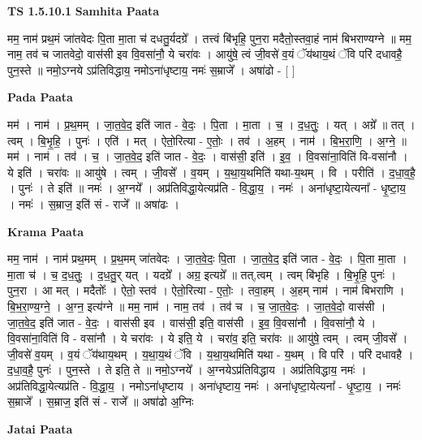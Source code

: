 \documentclass[17pt]{extarticle}
\begin{document}
\textbf{TS 1.5.10.1 } \newline
\textbf{Samhita Paata} \newline

मम॒ नाम॑ प्रथ॒मं जा॑तवेदः पि॒ता मा॒ता च॑ दधतु॒र्यदग्रे᳚ । तत्त्वं बि॑भृहि॒ पुन॒रा मदैतो॒स्तवा॒हं नाम॑ बिभराण्यग्ने ॥ मम॒ नाम॒ तव॑ च जातवेदो॒ वास॑सी इव वि॒वसा॑नौ॒ ये चरा॑वः । आयु॑षे॒ त्वं जी॒वसे॑ व॒यं ॅय॑थाय॒थं ॅवि परि॑ दधावहै॒ पुन॒स्ते ॥ नमो॒ऽग्नये ऽप्र॑तिविद्धाय॒ नमोऽना॑धृष्टाय॒ नमः॑ स॒म्राजे᳚ । अषा॑ढो - [ ] \newline

\textbf{Pada Paata} \newline

मम॑ । नाम॑ । प्र॒थ॒मम् । जा॒त॒वे॒द॒ इति॑ जात - वे॒दः॒ । पि॒ता । मा॒ता । च॒ । द॒ध॒तुः॒ । यत् । अग्रे᳚ ॥ तत् । त्वम् । बि॒भृ॒हि॒ । पुनः॑ । एति॑ । मत् । ऐतो॒रित्या - ए॒तोः॒ । तव॑ । अ॒हम् । नाम॑ । बि॒भ॒रा॒णि॒ । अ॒ग्ने॒ ॥ मम॑ । नाम॑ । तव॑ । च॒ । जा॒त॒वे॒द॒ इति॑ जात - वे॒दः॒ । वास॑सी॒ इति॑ । इ॒व॒ । वि॒वसा॑ना॒विति॑ वि-वसा॑नौ । ये इति॑ । चरा॑वः ॥ आयु॑षे । त्वम् । जी॒वसे᳚ । व॒यम् । य॒था॒य॒थमिति॑ यथा-य॒थम् । वि । परीति॑ । द॒धा॒व॒है॒ । पुनः॑ । ते इति॑ ॥ नमः॑ । अ॒ग्नये᳚ । अप्र॑तिविद्धा॒येत्यप्र॑ति - वि॒द्धा॒य॒ । नमः॑ । अना॑धृष्टा॒येत्यना᳚ - धृ॒ष्टा॒य॒ । नमः॑ । स॒म्राज॒ इति॑ सं - राजे᳚ ॥ अषा॑ढः ।  \newline


\textbf{Krama Paata} \newline

मम॒ नाम॑ । नाम॑ प्रथ॒मम् । प्र॒थ॒मम् जा॑तवेदः । जा॒त॒वे॒दः॒ पि॒ता । जा॒त॒वे॒द॒ इति॑ जात - वे॒दः॒ । पि॒ता मा॒ता । मा॒ता च॑ । च॒ द॒ध॒तुः॒ । द॒ध॒तु॒र् यत् । यदग्रे᳚ । अग्र॒ इत्यग्रे᳚ ॥ तत्,त्वम् । त्वम् बि॑भृहि । बि॒भृ॒हि॒ पुनः॑ । पुन॒रा । आ मत् । मदैतोः᳚ । ऐतो॒ स्तव॑ । ऐतो॒रित्या - ए॒तोः॒ । तवा॒हम् । अ॒हम् नाम॑ । नाम॑ बिभराणि । बि॒भ॒रा॒ण्य॒ग्ने॒ । अ॒ग्न॒ इत्य॑ग्ने ॥ मम॒ नाम॑ । नाम॒ तव॑ । तव॑ च । च॒ जा॒त॒वे॒दः॒ । जा॒त॒वे॒दो॒ वास॑सी । जा॒त॒वे॒द॒ इति॑ जात - वे॒दः॒ । वास॑सी इव । वास॑सी॒ इति॒ वास॑सी । इ॒व॒ वि॒वसा॑नौ । वि॒वसा॑नौ॒ ये । वि॒वसा॑ना॒विति॑ वि - वसा॑नौ । ये चरा॑वः । ये इति॒ ये । चरा॑व॒ इति॒ चरा॑वः ॥ आयु॑षे॒ त्वम् । त्वम् जी॒वसे᳚ । जी॒वसे॑ व॒यम् । व॒यं ॅय॑थाय॒थम् । य॒था॒य॒थं ॅवि । य॒था॒य॒थमिति॑ यथा - य॒थम् । वि परि॑ । परि॑ दधावहै । द॒धा॒व॒है॒ पुनः॑ । पुन॒स्ते । ते इति॒ ते ॥ नमो॒ऽग्नये᳚ । अ॒ग्नयेऽप्र॑तिविद्धाय । अप्र॑तिविद्धाय॒ नमः॑ । अप्र॑तिविद्धा॒येत्यप्र॑ति - वि॒द्धा॒य॒ । नमोऽना॑धृष्टाय । अना॑धृष्टाय॒ नमः॑ । अना॑धृष्टा॒येत्यना᳚ - धृ॒ष्टा॒य॒ । नमः॑ स॒म्राजे᳚ । स॒म्राज॒ इति॑ सं - राजे᳚ ॥ अषा॑ढो अ॒ग्निः \newline

\textbf{Jatai Paata} \newline
\end{document}
